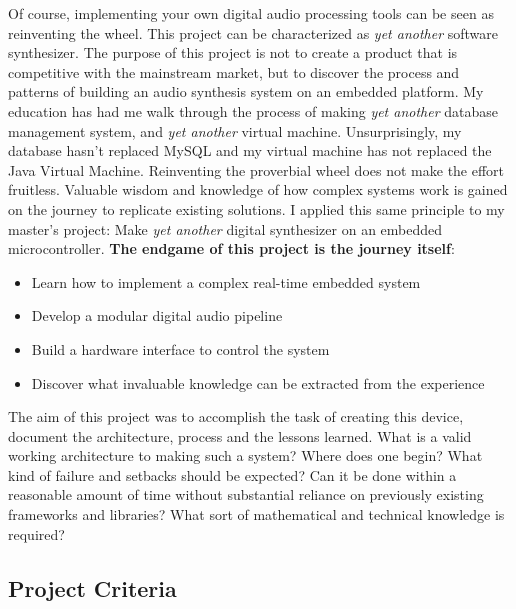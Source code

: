 \documentclass[acmlarge,screen]{acmart}
\begin{document}
	Of course, implementing your own digital audio processing tools can be seen as reinventing the wheel. This project can be characterized as \textit{yet another} software synthesizer. The purpose of this project is not to create a product that is competitive with the mainstream market, but to discover the process and patterns of building an audio synthesis system on an embedded platform. My education has had me walk through the process of making \textit{yet another} database management system, and \textit{yet another} virtual machine. Unsurprisingly, my database hasn't replaced MySQL and my virtual machine has not replaced the Java Virtual Machine. Reinventing the proverbial wheel does not make the effort fruitless. Valuable wisdom and knowledge of how complex systems work is gained on the journey to replicate existing solutions. I applied this same principle to my master's project: Make \textit{yet another} digital synthesizer on an embedded microcontroller. \textbf{The endgame of this project is the journey itself}:
	\begin{itemize}
		\item Learn how to implement a complex real-time embedded system
		\item Develop a modular digital audio pipeline
		\item Build a hardware interface to control the system
		\item Discover what invaluable knowledge can be extracted from the experience
	\end{itemize}
	The aim of this project was to accomplish the task of creating this device, document the architecture, process and the lessons learned. What is a valid working architecture to making such a system? Where does one begin? What kind of failure and setbacks should be expected? Can it be done within a reasonable amount of time without substantial reliance on previously existing frameworks and libraries? What sort of mathematical and technical knowledge is required?

\subsection{Project Criteria}
\end{document}
